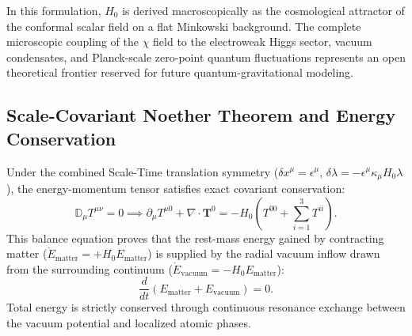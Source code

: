 \begin{remark}
    \label{rem:mikroskobik_dinamik}
    In this formulation, $H_0$ is derived macroscopically as the cosmological attractor of the conformal scalar field on a flat Minkowski background. The complete microscopic coupling of the $\chi$ field to the electroweak Higgs sector, vacuum condensates, and Planck-scale zero-point quantum fluctuations represents an open theoretical frontier reserved for future quantum-gravitational modeling.
\end{remark}

\subsection{Scale-Covariant Noether Theorem and Energy Conservation}
\label{sec:noether_enerji_main}

Under the combined Scale-Time translation symmetry ($\delta x^\mu = \epsilon^\mu$, $\delta\lambda = -\epsilon^\mu \kappa_\mu H_0 \lambda$), the energy-momentum tensor satisfies exact covariant conservation:
\begin{equation}
    \mathbb{D}_\mu T^{\mu\nu} = 0 \implies \partial_\mu T^{\mu 0} + \nabla \cdot \mathbf{T}^0 = - H_0 \left( T^{00} + \sum_{i=1}^3 T^{ii} \right).
    \label{eq:kovaryant_korunum_main}
\end{equation}
This balance equation proves that the rest-mass energy gained by contracting matter ($\dot{E}_{\mathrm{matter}} = + H_0 E_{\mathrm{matter}}$) is supplied by the radial vacuum inflow drawn from the surrounding continuum ($\dot{E}_{\mathrm{vacuum}} = - H_0 E_{\mathrm{matter}}$):
\begin{equation}
    \frac{d}{dt} \left( E_{\mathrm{matter}} + E_{\mathrm{vacuum}} \right) = 0.
    \label{eq:toplam_enerji_korunumu}
\end{equation}
Total energy is strictly conserved through continuous resonance exchange between the vacuum potential and localized atomic phases.
